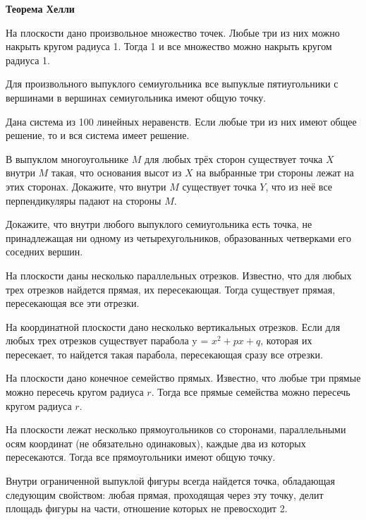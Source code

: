 \documentclass{article}
\begin{document}
    \large

    \begin{center}
        \textbf{Теорема Хелли}
    \end{center}

    \begin{enumerate_boxed}

        \item На плоскости дано произвольное множество точек.
        Любые три из них можно накрыть кругом радиуса 1.
        Тогда 1 и все множество можно накрыть кругом радиуса 1.

        \item Для произвольного выпуклого семиугольника все выпуклые пятиугольники с вершинами в вершинах семиугольника имеют общую точку.

        \item Дана система из 100 линейных неравенств.
        Если любые три из них имеют общее решение, то и вся система имеет решение.

        \item В выпуклом многоугольнике $M$ для любых трёх сторон существует точка $X$ внутри $M$ такая, что основания высот из $X$ на выбранные три стороны лежат на этих сторонах.
        Докажите, что внутри $M$ существует точка $Y$, что из неё все перпендикуляры падают на стороны $M$.

        \item Докажите, что внутри любого выпуклого семиугольника есть точка, не принадлежащая ни одному из четырехугольников, образованных четверками его соседних вершин.

        \item На плоскости даны несколько параллельных отрезков.
        Известно, что для любых трех отрезков найдется прямая, их пересекающая.
        Тогда существует прямая, пересекающая все эти отрезки.

        \item На координатной плоскости дано несколько вертикальных отрезков.
        Если для любых трех отрезков существует парабола y = $x^2 + px + q$, которая их пересекает, то найдется такая парабола, пересекающая сразу все отрезки.

        \item На плоскости дано конечное семейство прямых.
        Известно, что любые три прямые можно пересечь кругом радиуса $r$.
        Тогда все прямые семейства можно пересечь кругом радиуса $r$.

        \item На плоскости лежат несколько прямоугольников со сторонами, параллельными осям координат (не обязательно одинаковых), каждые два из которых пересекаются.
        Тогда все прямоугольники имеют общую точку.

        \item Внутри ограниченной выпуклой фигуры всегда найдется точка, обладающая следующим свойством: любая прямая, проходящая через эту точку, делит площадь фигуры на части, отношение которых не превосходит 2.

    \end{enumerate_boxed}
\end{document}

